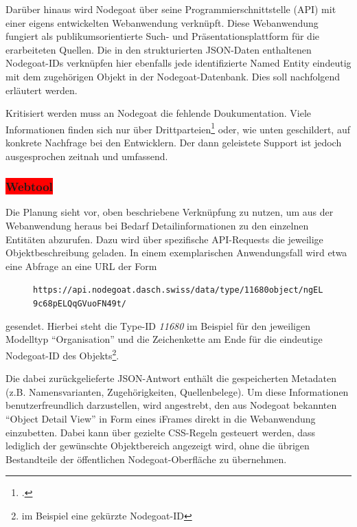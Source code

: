 \documentclass[12pt, a4paper, ngerman, bidi=default]{article}
\let\cite\footcite
\newcommand{\code}[1]{\colorbox{VeryLightGray}{\texttt{#1}}} %
\begin{document}
Darüber hinaus wird Nodegoat über seine Programmierschnittstelle (API) mit einer eigens entwickelten Webanwendung verknüpft. Diese Webanwendung fungiert als publikumsorientierte 
Such- und Präsentationsplattform für die erarbeiteten Quellen. Die in den strukturierten JSON-Daten enthaltenen Nodegoat-IDs verknüpfen hier ebenfalls jede identifizierte Named Entity eindeutig mit dem 
zugehörigen Objekt in der Nodegoat-Datenbank. Dies soll nachfolgend erläutert werden.

Kritisiert werden muss an Nodegoat die fehlende Doukumentation. Viele Informationen finden sich nur über Drittparteien\cite[beispielsweise durch Schulungsunterlagen von Universitäten, 
hier besonders:\\][]{gubler_nodegoat_nodate} oder, wie unten geschildert, auf konkrete Nachfrage bei den Entwicklern. Der dann geleistete Support 
ist jedoch ausgesprochen zeitnah und umfassend. 



\subsubsection{\colorbox{red}{Webtool}}\label{subsec:webtool_chapter}
Die Planung sieht vor, oben beschriebene Verknüpfung zu nutzen, um aus der Webanwendung heraus bei Bedarf Detailinformationen zu den einzelnen Entitäten abzurufen. 
Dazu wird über spezifische API-Requests die jeweilige Objektbeschreibung geladen. In einem exemplarischen Anwendungsfall wird etwa eine Abfrage an eine URL der Form
\begin{figure}
  \hspace*{-0.6cm}%
  \centering\code{https://api.nodegoat.dasch.swiss/data/type/\colorbox{MediumGray}{11680}object/ngEL9c68pELQqGVuoFN49t/}
\end{figure}
gesendet. Hierbei steht die Type-ID \textit{11680} im Beispiel für den jeweiligen Modelltyp \enquote{Organisation} und die Zeichenkette am Ende für die eindeutige Nodegoat-ID 
des Objekts\footnote{im Beispiel eine gekürzte Nodegoat-ID}.

Die dabei zurückgelieferte JSON-Antwort enthält die gespeicherten Metadaten (z.B. Namensvarianten, Zugehörigkeiten, Quellenbelege). Um diese Informationen benutzerfreundlich darzustellen, 
wird angestrebt, den aus Nodegoat bekannten \enquote{Object Detail View} in Form eines iFrames direkt in die Webanwendung einzubetten. Dabei kann über gezielte CSS-Regeln gesteuert werden, dass 
lediglich der gewünschte Objektbereich angezeigt wird, ohne die übrigen Bestandteile der öffentlichen Nodegoat-Oberfläche zu übernehmen.
\end{document}
